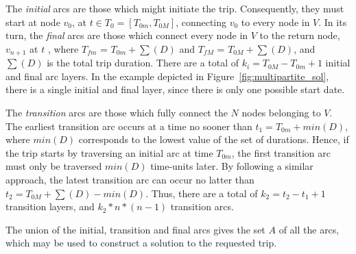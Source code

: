 The \textit{initial} arcs are those which might initiate the trip. Consequently,
they must start at node $v_0$, at $t \in T_0 = [T_{0m}, T_{0M}]$,
connecting $v_0$ to every node in $V$. In its turn, the \textit{final} arcs are those which connect every node in $V$ to
the return node, $v_{n+1}$ at $t$ \in [$T_{fm}$, $T_{fM}$], where $T_{fm}$ =
$T_{0m} + \sum(D)$ and $T_{fM}$ = $T_{0M} + \sum(D)$, and $\sum(D)$
is the total trip duration. There are a total of $k_i = T_{0M} -
T_{0m} + 1$ initial and final arc layers. In the example
depicted in Figure~\ref{fig:multipartite_sol}, there is a single initial and
final layer, since there is only one possible start date.

The \textit{transition} arcs are those which fully connect the $N$ nodes
belonging to $V$. The earliest transition arc occurs at a time no sooner than
$t_1 = T_{0m} + min(D)$, where $min(D)$ corresponds to the lowest value of the
set of durations. Hence, if the trip starts by traversing an initial arc
at time $T_{0m}$, the first transition arc must only be traversed $min(D)$
time-units later. By following a similar approach, the latest transition arc can
occur no latter than $t_2 = T_{0M} + \sum(D) - min(D)$. Thus, there are a total
of $k_2 = t_2-t_1+1$ transition layers, and $k_2*n*(n-1)$ transition arcs.

The union of the initial, transition and final arcs gives the set $A$ of all the
arcs, which may be used to construct a solution to the requested trip. 


